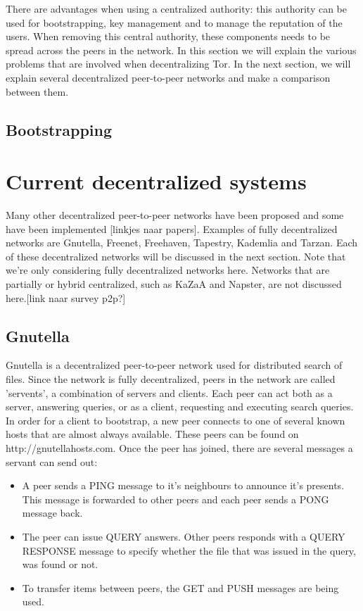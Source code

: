 \documentclass[journal]{IEEEtran}
\begin{document}
		There are advantages when using a centralized authority: this authority can be used for bootstrapping, key management and to manage the reputation of the users. When removing this central authority, these components needs to be spread across the peers in the network. In this section we will explain the various problems that are involved when decentralizing Tor. In the next section, we will explain several decentralized peer-to-peer networks and make a comparison between them.
		
		\subsection{Bootstrapping}
	
	\section{Current decentralized systems}
		Many other decentralized peer-to-peer networks have been proposed and some have been implemented [linkjes naar papers]. Examples of fully decentralized networks are Gnutella, Freenet, Freehaven, Tapestry, Kademlia and Tarzan. Each of these decentralized networks will be discussed in the next section. Note that we're only considering fully decentralized networks here. Networks that are partially or hybrid centralized, such as KaZaA and Napster, are not discussed here.[link naar survey p2p?]
	
		\subsection{Gnutella}
			Gnutella is a decentralized peer-to-peer network used for distributed search of files. Since the network is fully decentralized, peers in the network are called 'servents', a combination of servers and clients. Each peer can act both as a server, answering queries, or as a client, requesting and executing search queries. In order for a client to bootstrap, a new peer connects to one of several known hosts that are almost always available. These peers can be found on http://gnutellahosts.com. Once the peer has joined, there are several messages a servant can send out:
		
			\begin{itemize}
				\item A peer sends a PING message to it's neighbours to announce it's presents. This message is forwarded to other peers and each peer sends a PONG message back.
				\item The peer can issue QUERY answers. Other peers responds with a QUERY RESPONSE message to specify whether the file that was issued in the query, was found or not.
				\item To transfer items between peers, the GET and PUSH messages are being used.
			\end{itemize}
			
\end{document}
